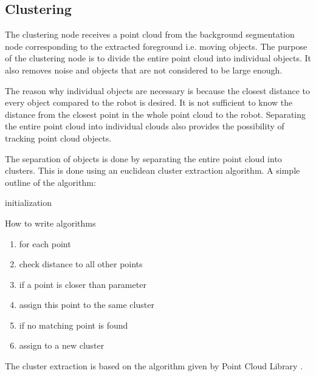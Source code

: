 
\subsection{Clustering}
The clustering node receives a point cloud from the background segmentation node corresponding to the extracted foreground i.e. moving objects. The purpose of the clustering node is to divide the entire point cloud into individual objects. It also removes noise and objects that are not considered to be large enough.  

The reason why individual objects are necessary is because the closest distance to every object compared to the robot is desired. It is not sufficient to know the distance from the closest point in the whole point cloud to the robot. Separating the entire point cloud into individual clouds also provides the possibility of tracking point cloud objects. 


The separation of objects is done by separating the entire point cloud into clusters. This is done using an euclidean cluster extraction algorithm. A simple outline of the algorithm:


\begin{algorithm}[H]
 \SetAlgoLined %
 initialization\;
 \caption{How to write algorithms}
\end{algorithm}

\begin{enumerate}
\item for each point
\item check distance to all other points
\item if a point is closer than parameter
\item assign this point to the same cluster
\item if no matching point is found
\item assign to a new cluster
\end{enumerate} 

 The cluster extraction is based on the algorithm given by Point Cloud Library \cite{CE}.
